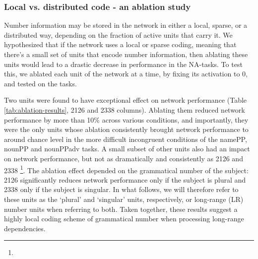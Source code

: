 
\subsubsection{Local vs. distributed code - an ablation study}
Number information may be stored in the network in either a local,
sparse, or a distributed way, depending on the fraction of active
units that carry it.  We hypothesized that if the network uses a local
or sparse coding, meaning that there's a small set of units that
encode number information, then ablating these units would lead to a
drastic decrease in performance in the NA-tasks.  To test this, we
ablated each unit of the network at a time, by fixing its activation
to 0, and tested on the tasks.

Two units were found to have exceptional effect on network performance
(Table \ref{tab:ablation-results}, \unit{2}{126} and \unit{2}{338}
columns). Ablating them reduced network performance by more than 10\%
across various conditions, and importantly, they were the only units
whose ablation consistently brought network performance to around
chance level in the more difficult incongruent conditions of the
namePP, nounPP and nounPPadv tasks. A small subset of other units
also had an impact on network performance, but not as dramatically and
consistently as \unit{2}{126} and \unit{2}{338}
\footnote{}. The ablation effect depended on the
grammatical number of the subject: \unit{2}{126} significantly reduces
network performance only if the subject is plural and \unit{2}{338}
only if the subject is singular. In what follows, we will therefore
refer to these units as the `plural' and `singular' units, respectively,
or long-range (LR) number units when referring to both. Taken
together, these results suggest a highly local coding scheme of
grammatical number when processing long-range dependencies.

